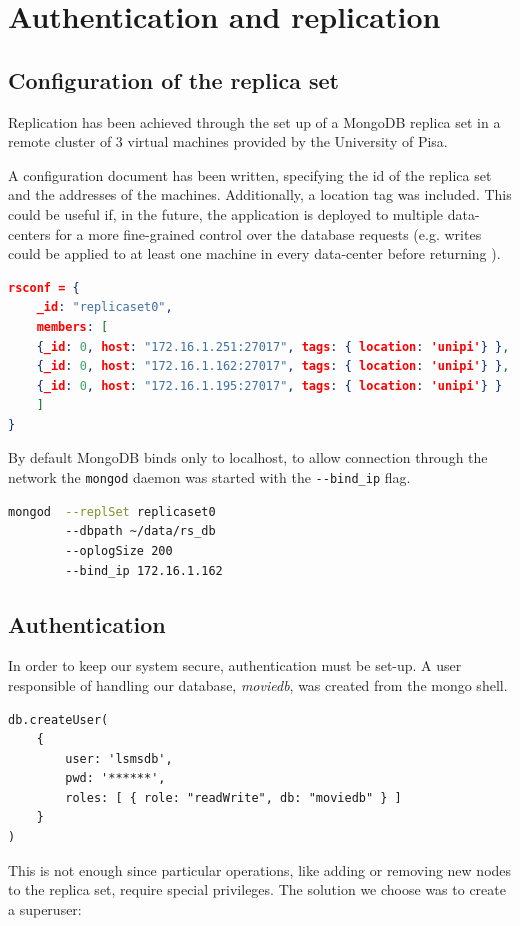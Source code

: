 \documentclass[11pt]{article}
\begin{document}
\section{Authentication and replication}
\subsection{Configuration of the replica set}
Replication has been achieved through the set up of a MongoDB replica set in a remote cluster of 3 virtual machines provided by the University of Pisa.

A configuration document has been written, specifying the id of the replica set and the addresses of the machines. Additionally, a location tag was included. This could be useful if, in the future, the application is deployed to multiple data-centers for a more fine-grained control over the database requests (e.g. writes could be applied to at least one machine in every data-center before returning ). 

\begin{lstlisting}[language=json]	
rsconf = {
	_id: "replicaset0",
	members: [
	{_id: 0, host: "172.16.1.251:27017", tags: { location: 'unipi'} },
	{_id: 0, host: "172.16.1.162:27017", tags: { location: 'unipi'} },
	{_id: 0, host: "172.16.1.195:27017", tags: { location: 'unipi'} }
	]
}
\end{lstlisting}

By default MongoDB binds only to localhost, to allow connection through the network the \lstinline{mongod} daemon was started with the \lstinline{--bind_ip} flag.

\begin{lstlisting}[language=bash]
mongod 	--replSet replicaset0
		--dbpath ~/data/rs_db
		--oplogSize 200 
		--bind_ip 172.16.1.162
\end{lstlisting}
\subsection{Authentication}
In order to keep our system secure, authentication must be set-up.
A user responsible of handling our database, \textit{moviedb}, was created from the mongo shell.
\begin{lstlisting}
db.createUser(
	{
		user: 'lsmsdb',
		pwd: '******',
		roles: [ { role: "readWrite", db: "moviedb" } ]
	}
)
\end{lstlisting}

This is not enough since particular operations, like adding or removing new nodes to the replica set, require special privileges. The solution we choose was to create a superuser:
\end{document}
